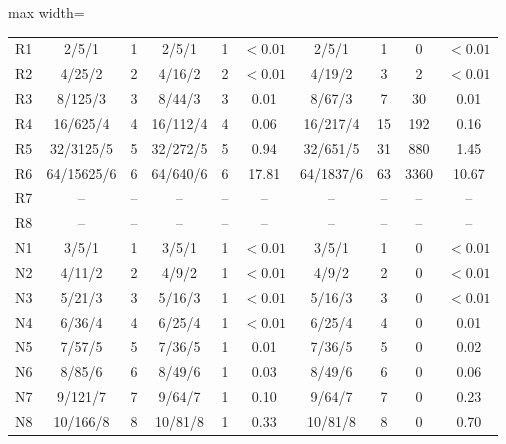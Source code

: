 \begin{table}[t]
\begin{adjustbox}{max width=\textwidth}
\begin{tabular}{@{}lccccccccc@{}}
R1 & 2/5/1 & 1 & 2/5/1 & 1 & $<0.01$ & 2/5/1 & 1 & 0 & $<0.01$\\
R2 & 4/25/2 & 2 & 4/16/2 & 2 & $<0.01$ & 4/19/2 & 3 & 2 & $<0.01$\\
R3 & 8/125/3 & 3 & 8/44/3 & 3 & 0.01 & 8/67/3 & 7 & 30 & 0.01\\
R4 & 16/625/4 & 4 & 16/112/4 & 4 & 0.06 & 16/217/4 & 15 & 192 & 0.16\\
R5 & 32/3125/5 & 5 & 32/272/5 & 5 & 0.94 & 32/651/5 & 31 & 880 & 1.45\\
R6 & 64/15625/6 & 6 & 64/640/6 & 6 & 17.81 & 64/1837/6 & 63 & 3360 & 10.67\\
R7 & -- & -- & -- & -- & -- & -- & -- & -- & --\\
R8 & -- & -- & -- & -- & -- & -- & -- & -- & --\\
N1 & 3/5/1 & 1 & 3/5/1 & 1 & $<0.01$ & 3/5/1 & 1 & 0 & $<0.01$\\
N2 & 4/11/2 & 2 & 4/9/2 & 1 & $<0.01$ & 4/9/2 & 2 & 0 & $<0.01$\\
N3 & 5/21/3 & 3 & 5/16/3 & 1 & $<0.01$ & 5/16/3 & 3 & 0 & $<0.01$\\
N4 & 6/36/4 & 4 & 6/25/4 & 1 & $<0.01$ & 6/25/4 & 4 & 0 & 0.01\\
N5 & 7/57/5 & 5 & 7/36/5 & 1 & 0.01 & 7/36/5 & 5 & 0 & 0.02\\
N6 & 8/85/6 & 6 & 8/49/6 & 1 & 0.03 & 8/49/6 & 6 & 0 & 0.06\\
N7 & 9/121/7 & 7 & 9/64/7 & 1 & 0.10 & 9/64/7 & 7 & 0 & 0.23\\
N8 & 10/166/8 & 8 & 10/81/8 & 1 & 0.33 & 10/81/8 & 8 & 0 & 0.70\\
\bottomrule
\end{tabular}\end{adjustbox}
\end{table}
